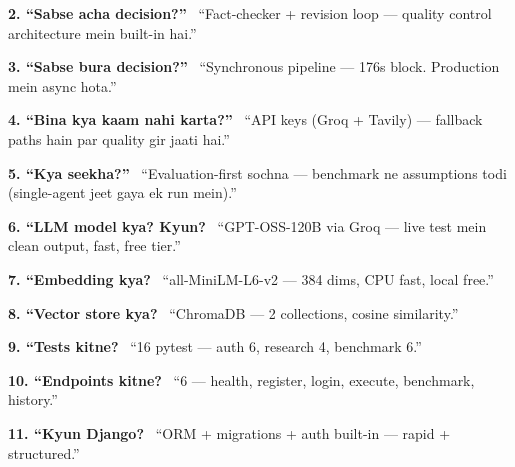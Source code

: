 \begin{interviewbox}
\textbf{2. ``Sabse acha decision?''} \ ``Fact-checker + revision loop --- quality control architecture mein built-in hai.''
\end{interviewbox}

\begin{interviewbox}
\textbf{3. ``Sabse bura decision?''} \ ``Synchronous pipeline --- 176s block. Production mein async hota.''
\end{interviewbox}

\begin{interviewbox}
\textbf{4. ``Bina kya kaam nahi karta?''} \ ``API keys (Groq + Tavily) --- fallback paths hain par quality gir jaati hai.''
\end{interviewbox}

\begin{interviewbox}
\textbf{5. ``Kya seekha?''} \ ``Evaluation-first sochna --- benchmark ne assumptions todi (single-agent jeet gaya ek run mein).''
\end{interviewbox}

\begin{interviewbox}
\textbf{6. ``LLM model kya? Kyun?} \ ``GPT-OSS-120B via Groq --- live test mein clean output, fast, free tier.''
\end{interviewbox}

\begin{interviewbox}
\textbf{7. ``Embedding kya?} \ ``all-MiniLM-L6-v2 --- 384 dims, CPU fast, local free.''
\end{interviewbox}

\begin{interviewbox}
\textbf{8. ``Vector store kya?} \ ``ChromaDB --- 2 collections, cosine similarity.''
\end{interviewbox}

\begin{interviewbox}
\textbf{9. ``Tests kitne?} \ ``16 pytest --- auth 6, research 4, benchmark 6.''
\end{interviewbox}

\begin{interviewbox}
\textbf{10. ``Endpoints kitne?} \ ``6 --- health, register, login, execute, benchmark, history.''
\end{interviewbox}

\begin{interviewbox}
\textbf{11. ``Kyun Django?} \ ``ORM + migrations + auth built-in --- rapid + structured.''
\end{interviewbox}

